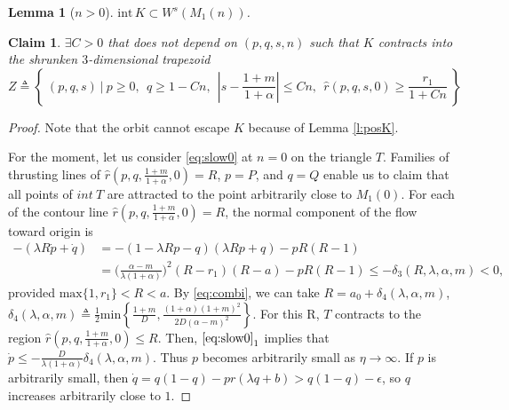 \documentclass[a4paper,11pt]{article}
\newtheorem{lemma}{Lemma}[section]
\newtheorem{claim}{Claim}
\begin{document}
{%
\begin{lemma}[$n>0$] \label{lem:3dstable}
$\textrm{int}\, K \subset W^s(M_1(n))$.
\end{lemma}
\begin{claim}
$\exists C>0$ that does not depend on $(p,q,s,n)$ such that $K$ contracts into the shrunken $3$-dimensional trapezoid 
\begin{equation} \label{eq:Z} 
Z\triangleq \left\{ \: (p,q,s) \: | \:  p\ge0, ~~ q\ge 1-Cn, ~~ \left|s-\frac{1+m}{1+\alpha}\right| \le Cn, ~~ \hat{r}(p,q,s,0)\ge \frac{r_1}{1+Cn}\: \right\}
\end{equation}
\end{claim}
\begin{proof}
Note that the orbit cannot escape $K$ because of Lemma \ref{l:posK}. 

For the moment, let us consider \eqref{eq:slow0} at $n=0$ on the triangle $T$. Families of thrusting lines of $\hat{r}(p,q,\frac{1+m}{1+\alpha},0)=R$, $p=P$, and $q=Q$ enable us to claim that all points of $int \ T$ are attracted to the point arbitrarily close to $M_1(0)$. 
% 
% 
For each of the contour line $\hat{r}(p,q,\frac{1+m}{1+\alpha},0)=R$, the normal component of the flow toward origin  is
\begin{align*}
 -(\lambda R \dot{p} + \dot{q}) &= -(1-\lambda Rp -q)(\lambda Rp+q) -pR(R-1) \\
 &= \Big(\frac{\alpha-m}{\lambda(1+\alpha)}\Big)^2 (R-r_1)(R-a) -pR(R-1) \le -\delta_3(R,\lambda,\alpha,m) <0,
\end{align*}
provided $\textrm{max}\{1,r_1\} <R<a$. By \eqref{eq:combi}, we can take ${R} = a_0+\delta_4(\lambda,\alpha,m)$, \\$\delta_4(\lambda,\alpha,m)\triangleq\frac{1}{2}\textrm{min}\left\{\frac{1+m}{D},\frac{(1+\alpha)(1+m)^2}{2D(\alpha-m)^2}\right\}$.  For this R, $T$ contracts to the region $\hat{r}(p,q,\frac{1+m}{1+\alpha},0)\le{R}$.
Then, $\eqref{eq:slow0}_1$ implies that $\dot{p} \le -\frac{D}{\lambda(1+\alpha)}\delta_4(\lambda,\alpha,m)$. Thus $p$ becomes arbitrarily small as $\eta \rightarrow \infty$. If $p$ is arbitrarily small, then $\dot{q} = q(1-q) -pr(\lambda q +b) > q(1-q) -\epsilon$, so $q$ increases arbitrarily close to $1$. %


\end{proof}}
\end{document}
